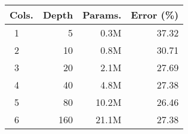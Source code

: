 \begin{tabular}{@{}lrrr@{}}
  Cols. & Depth  & Params.    &  Error (\%)\\
\toprule
     ~1 &      5 &       0.3M &      37.32 \\   %
     ~2 &     10 &       0.8M &      30.71 \\   %
     ~3 &     20 &       2.1M &      27.69 \\   %
     ~4 &     40 &       4.8M &      27.38 \\   %
     ~5 &     80 &      10.2M &      26.46 \\   %
     ~6 &    160 &      21.1M &      27.38 \\   %
\bottomrule
\end{tabular}
